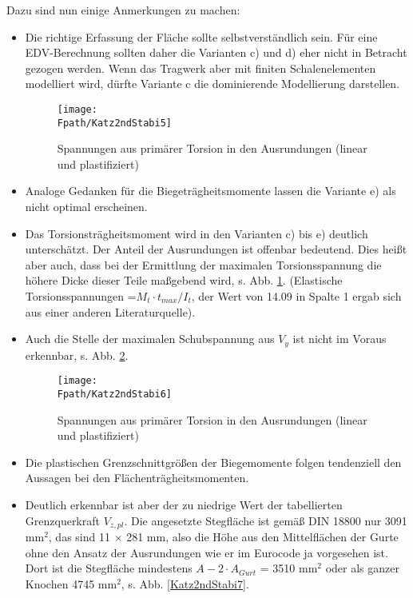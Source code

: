 \noindent Dazu sind nun einige Anmerkungen zu machen:\\
\begin{itemize}
  \item Die richtige Erfassung der Fl\"{a}che sollte selbstverst\"{a}ndlich sein. F\"{u}r eine EDV-Berechnung sollten daher die Varianten c) und d) eher nicht in Betracht gezogen werden. Wenn das Tragwerk aber mit finiten Schalenelementen modelliert wird, d\"{u}rfte Variante c die dominierende Modellierung darstellen.
\begin{figure}[tbp] \centering
\centering
\if {} \sidecaption[t] \fi
\texttt{[image: \\Fpath/Katz2ndStabi5]}
\caption{Spannungen aus prim\"{a}rer Torsion in den Ausrundungen (linear und plastifiziert)} \label{Katz2ndStabi5}
\end{figure}%
  \item Analoge Gedanken f\"{u}r die Biegetr\"{a}gheitsmomente lassen die Variante e) als nicht optimal erscheinen.
  \item Das Torsionstr\"{a}gheitsmoment wird in den Varianten c) bis e) deutlich untersch\"{a}tzt. Der Anteil der Ausrundungen ist offenbar bedeutend. Dies hei{\ss}t aber auch, dass bei der Ermittlung der maximalen Torsionsspannung die h\"{o}here Dicke dieser Teile ma{\ss}gebend wird, s. Abb. \ref{Katz2ndStabi5}. (Elastische Torsionsspannungen =$ M_t \cdot t_{max}/I_t$, der Wert von 14.09 in Spalte 1 ergab sich aus einer anderen Literaturquelle).
  \item Auch die Stelle der maximalen Schubspannung aus $V_y$ ist nicht im Voraus erkennbar, s. Abb. \ref{Katz2ndStabi6}.
\begin{figure}[tbp] \centering
\centering
\if {} \sidecaption[t] \fi
\texttt{[image: \\Fpath/Katz2ndStabi6]}
\caption{Spannungen aus prim\"{a}rer Torsion in den Ausrundungen (linear und plastifiziert)} \label{Katz2ndStabi6}
\end{figure}%
  \item Die plastischen Grenzschnittgr\"{o}{\ss}en der Biegemomente folgen tendenziell den Aussagen bei den Fl\"{a}chentr\"{a}gheitsmomenten.
      \item Deutlich erkennbar ist aber der zu niedrige Wert der tabellierten Grenzquerkraft $V_{z,pl}$. Die angesetzte Stegfl\"{a}che ist gem\"{a}{\ss} DIN 18800 nur 3091 mm$^2$, das sind 11 $\times$ 281 mm, also die H\"{o}he aus den Mittelfl\"{a}chen der Gurte ohne den Ansatz der Ausrundungen wie er im Eurocode ja vorgesehen ist. Dort ist die Stegfl\"{a}che mindestens $A-2 \cdot A_{Gurt}$ = 3510 mm$^2$ oder als ganzer Knochen 4745 mm$^2$, s. Abb. \ref{Katz2ndStabi7}.

\end{itemize}
